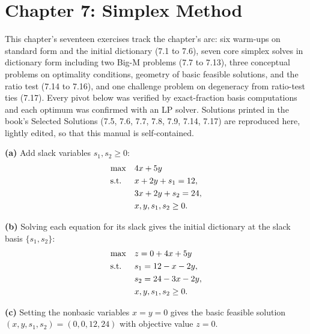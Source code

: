 \section{Chapter 7: Simplex Method}

This chapter's seventeen exercises track the chapter's arc: six warm-ups on
standard form and the initial dictionary (7.1 to 7.6), seven core simplex
solves in dictionary form including two Big-M problems (7.7 to 7.13), three
conceptual problems on optimality conditions, geometry of basic feasible
solutions, and the ratio test (7.14 to 7.16), and one challenge problem on
degeneracy from ratio-test ties (7.17). Every pivot below was verified by
exact-fraction basis computations and each optimum was confirmed with an LP
solver. Solutions printed in the book's Selected Solutions (7.5, 7.6, 7.7,
7.8, 7.9, 7.14, 7.17) are reproduced here, lightly edited, so that this
manual is self-contained.


\textbf{(a)} Add slack variables $s_1, s_2 \geq 0$:
\[
\begin{aligned}
\max \quad & 4x + 5y \\
\text{s.t.}\;\; \quad & x + 2y + s_1 = 12, \\
& 3x + 2y + s_2 = 24, \\
& x, y, s_1, s_2 \geq 0.
\end{aligned}
\]

\textbf{(b)} Solving each equation for its slack gives the initial dictionary
at the slack basis $\{s_1, s_2\}$:
\[
\begin{aligned}
\max \quad & z = 0 + 4x + 5y \\
\text{s.t.}\;\; \quad & s_1 = 12 - x - 2y, \\
& s_2 = 24 - 3x - 2y, \\
& x, y, s_1, s_2 \geq 0.
\end{aligned}
\]

\textbf{(c)} Setting the nonbasic variables $x = y = 0$ gives the basic
feasible solution $(x, y, s_1, s_2) = (0, 0, 12, 24)$ with objective value
$z = 0$.

